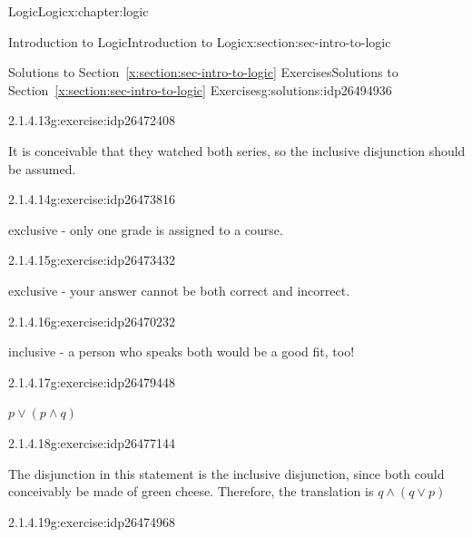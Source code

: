 \documentclass[twoside,10pt,]{book}
\newcommand{\xreffont}{\relax}
\numberwithin{equation}{section}
\begin{document}
\begin{chapterptx}{Logic}{}{Logic}{}{}{x:chapter:logic}
\begin{sectionptx}{Introduction to Logic}{}{Introduction to Logic}{}{}{x:section:sec-intro-to-logic}
\begin{solutions-subsection}{Solutions to Section~{\xreffont\ref*{x:section:sec-intro-to-logic}} Exercises}{}{Solutions to Section~{\xreffont\ref*{x:section:sec-intro-to-logic}} Exercises}{}{}{g:solutions:idp26494936}
\begin{exercisegroup}
\begin{divisionsolutioneg}{2.1.4.13}{}{g:exercise:idp26472408}
\par\smallskip%
\noindent\hypertarget{g:solution:idp26472792-main}{}It is conceivable that they watched both series, so the inclusive disjunction should be assumed.\end{divisionsolutioneg}%
\begin{divisionsolutioneg}{2.1.4.14}{}{g:exercise:idp26473816}%
\par\smallskip%
\noindent\hypertarget{g:solution:idp26467928-main}{}exclusive - only one grade is assigned to a course.\end{divisionsolutioneg}%
\begin{divisionsolutioneg}{2.1.4.15}{}{g:exercise:idp26473432}%
\par\smallskip%
\noindent\hypertarget{g:solution:idp26469208-main}{}exclusive - your answer cannot be both correct and incorrect.\end{divisionsolutioneg}%
\begin{divisionsolutioneg}{2.1.4.16}{}{g:exercise:idp26470232}%
\par\smallskip%
\noindent\hypertarget{g:solution:idp26470744-main}{}inclusive - a person who speaks both would be a good fit, too!\end{divisionsolutioneg}%
\end{exercisegroup}
\par\medskip\noindent
\begin{exercisegroup}
\begin{divisionsolutioneg}{2.1.4.17}{}{g:exercise:idp26479448}%
\par\smallskip%
\noindent\hypertarget{g:solution:idp26476248-main}{}\(p{\vee}(p{\wedge} q)\)\end{divisionsolutioneg}%
\begin{divisionsolutioneg}{2.1.4.18}{}{g:exercise:idp26477144}%
\par\smallskip%
\noindent\hypertarget{g:solution:idp26481880-main}{}The disjunction in this statement is the inclusive disjunction, since both could conceivably be made of green cheese.  Therefore, the translation is \(q{\wedge}(q{\vee} p)\)\end{divisionsolutioneg}%
\begin{divisionsolutioneg}{2.1.4.19}{}{g:exercise:idp26474968}%
\par\smallskip%

\end{divisionsolutioneg}
\end{exercisegroup}
\end{solutions-subsection}
\end{sectionptx}
\end{chapterptx}
\end{document}
